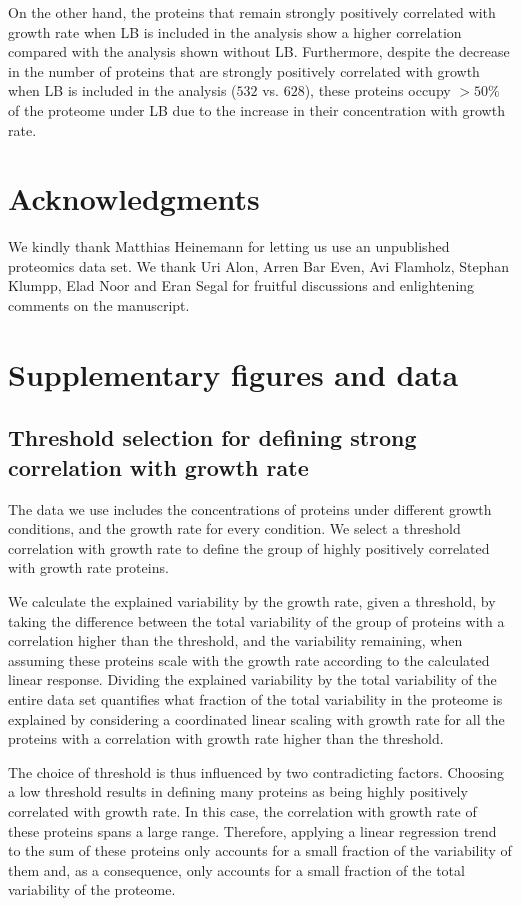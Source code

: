 \documentclass[a4paper]{article}
\newcommand{\beginsupplement}{%
        \setcounter{table}{0}
        \renewcommand{\thetable}{S\arabic{table}}%
        \setcounter{figure}{0}
        \renewcommand{\thefigure}{S\arabic{figure}}%
     }
\begin{document}
On the other hand, the proteins that remain strongly positively correlated with growth rate when LB is included in the analysis show a higher correlation compared with the analysis shown without LB.
Furthermore, despite the decrease in the number of proteins that are strongly positively correlated with growth when LB is included in the analysis ($532$ vs. $628$), these proteins occupy $>50\%$ of the proteome under LB due to the increase in their concentration with growth rate.

\section{Acknowledgments}
We kindly thank Matthias Heinemann for letting us use an unpublished proteomics data set.
We thank Uri Alon, Arren Bar Even, Avi Flamholz, Stephan Klumpp, Elad Noor and Eran Segal for fruitful discussions and enlightening comments on the manuscript.



\section{Supplementary figures and data}
\beginsupplement
\subsection{Threshold selection for defining strong correlation with growth rate}
\label{corrthreshold} 
The data we use includes the concentrations of proteins under different growth conditions, and the growth rate for every condition.
We select a threshold correlation with growth rate to define the group of highly positively correlated with growth rate proteins.

We calculate the explained variability by the growth rate, given a threshold, by taking the difference between the total variability of the group of proteins with a correlation higher than the threshold, and the variability remaining, when assuming these proteins scale with the growth rate according to the calculated linear response.
Dividing the explained variability by the total variability of the entire data set quantifies what fraction of the total variability in the proteome is explained by considering a coordinated linear scaling with growth rate for all the proteins with a correlation with growth rate higher than the threshold.

The choice of threshold is thus influenced by two contradicting factors.
Choosing a low threshold results in defining many proteins as being highly positively correlated with growth rate.
In this case, the correlation with growth rate of these proteins spans a large range.
Therefore, applying a linear regression trend to the sum of these proteins only accounts for a small fraction of the variability of them and, as a consequence, only accounts for a small fraction of the total variability of the proteome.
\end{document}
